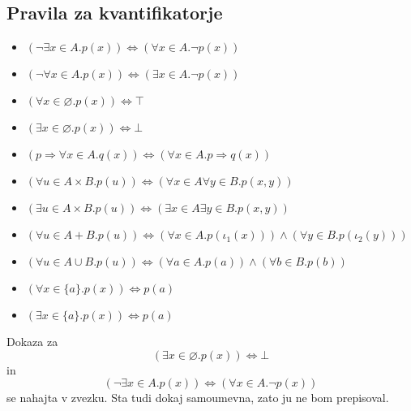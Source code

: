 \subsection{Pravila za kvantifikatorje}
\begin{itemize}
	\item $(\lnot \exists x \in A. p(x)) \iff (\forall x \in A . \lnot p(x))$
	\item $(\lnot \forall x \in A . p(x)) \iff (\exists x \in A . \lnot p(x))$
	\item $(\forall x \in \varnothing . p(x)) \iff \top$
	\item $(\exists x \in \varnothing . p(x)) \iff \bot$
	\item $(p \Rightarrow \forall x \in A . q(x)) \iff (\forall x \in A . p \Rightarrow q(x))$
	\item $(\forall u \in A \times B . p(u)) \iff (\forall x \in A \forall y \in B . p(x, y))$
	\item $(\exists u \in A \times B . p(u)) \iff (\exists x \in A \exists y \in B . p(x, y))$
	\item $(\forall u \in A + B . p(u)) \iff (\forall x \in A . p(\iota_1(x))) \land (\forall y \in B . p (\iota_2(y)))$
	\item $(\forall u \in A \cup B . p(u)) \iff (\forall a \in A. p(a)) \land (\forall b \in B . p(b))$
	\item $(\forall x \in \{a\} . p(x)) \iff p(a)$
	\item $(\exists x \in \{a\} . p(x)) \iff p(a)$
\end{itemize}

Dokaza za 
\begin{equation*}
(\exists x \in \varnothing . p(x)) \iff \bot
\end{equation*}
in
\begin{equation*}
(\lnot \exists x \in A . p(x)) \iff (\forall x \in A . \lnot p(x))
\end{equation*}
se nahajta v zvezku. Sta tudi dokaj samoumevna, zato ju ne bom prepisoval.
